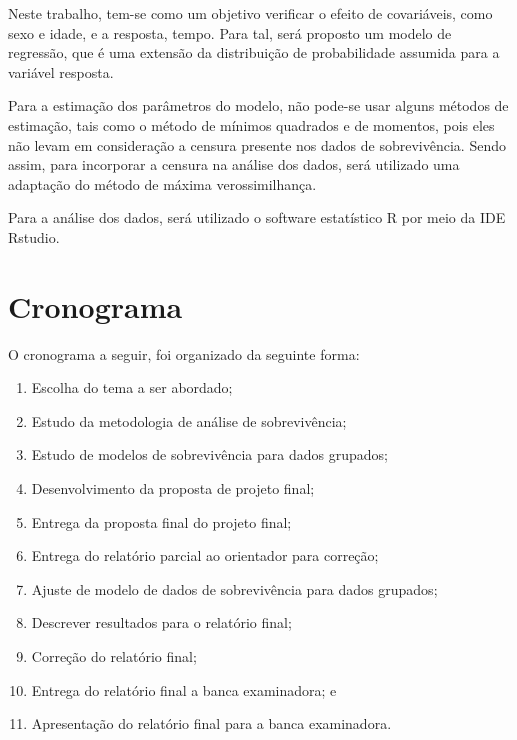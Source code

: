 \documentclass[a4paper,12pt]{article}
\begin{document}
Neste trabalho, tem-se como um objetivo verificar o efeito de covariáveis, como sexo e idade, e a resposta, tempo. Para tal, será proposto um modelo de regressão, que é uma extensão da distribuição de probabilidade assumida para a variável resposta.

Para a estimação dos parâmetros do modelo, não pode-se usar alguns métodos de estimação, tais como o método de mínimos quadrados e de momentos, pois eles não levam em consideração a censura presente nos dados de sobrevivência. Sendo assim, para incorporar a censura na análise dos dados, será utilizado uma adaptação do método de máxima verossimilhança.

Para a análise dos dados, será utilizado o software estatístico R por meio da IDE Rstudio.

	
\section{Cronograma}

O cronograma a seguir, foi organizado da seguinte forma:

\begin{enumerate}
	\item Escolha do tema a ser abordado;
	\item Estudo da metodologia de análise de sobrevivência;
	\item Estudo de modelos de sobrevivência para dados grupados;
	\item Desenvolvimento da proposta de projeto final;	
	\item Entrega da proposta final do projeto final;
	\item Entrega do relatório parcial ao orientador para correção;
	\item Ajuste de modelo de dados de sobrevivência para dados grupados;
	\item Descrever resultados para o relatório final;
	\item Correção do relatório final;
	\item Entrega do relatório final a banca examinadora; e
	\item Apresentação do relatório final para a banca examinadora.
\end{enumerate}
		
\end{document}
